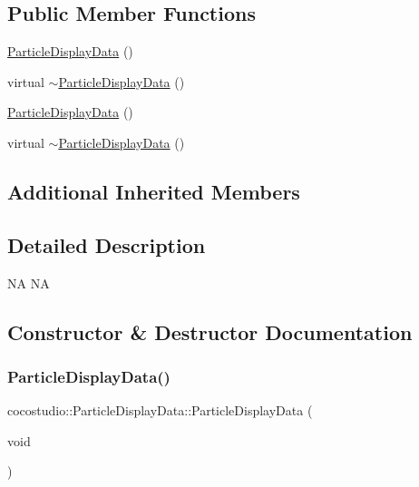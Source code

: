 \subsection*{Public Member Functions}
\begin{DoxyCompactItemize}
\item 
\hyperlink{classcocostudio_1_1ParticleDisplayData_a2f223141332c75205347d3366c0acc48}{Particle\+Display\+Data} ()
\item 
virtual \hyperlink{classcocostudio_1_1ParticleDisplayData_a98a66236c3eb3f6af329aa828aceabdc}{$\sim$\+Particle\+Display\+Data} ()
\item 
\hyperlink{classcocostudio_1_1ParticleDisplayData_a2f223141332c75205347d3366c0acc48}{Particle\+Display\+Data} ()
\item 
virtual \hyperlink{classcocostudio_1_1ParticleDisplayData_a98a66236c3eb3f6af329aa828aceabdc}{$\sim$\+Particle\+Display\+Data} ()
\end{DoxyCompactItemize}
\subsection*{Additional Inherited Members}


\subsection{Detailed Description}
NA  NA 

\subsection{Constructor \& Destructor Documentation}
\mbox{\label{classcocostudio_1_1ParticleDisplayData_a2f223141332c75205347d3366c0acc48}} 
\subsubsection{\texorpdfstring{Particle\+Display\+Data()}{ParticleDisplayData()}\hspace{0.1cm}{\footnotesize\ttfamily [1/2]}}
{\footnotesize\ttfamily cocostudio\+::\+Particle\+Display\+Data\+::\+Particle\+Display\+Data (\begin{DoxyParamCaption}\item[{void}]{ }\end{DoxyParamCaption})}

